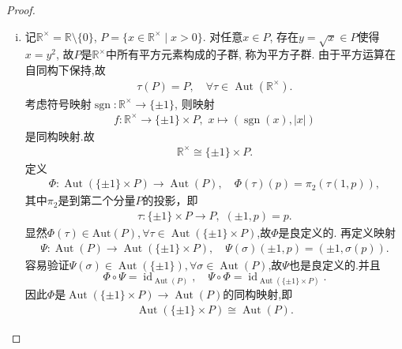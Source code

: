 \documentclass[../../main.tex]{subfiles}%
\begin{document}
\begin{proof}
\begin{enumerate}[(1)]
\begin{enumerate}[(i)]
反之, 任何$\mathbb{R}$上的线性映射显然是加法群同态. 于是加法群同态与$\mathbb{R}$上的线性映射一一对应. 可逆的加法自同构对应可逆的$\mathbb{R}$上的线性映射, 即
$\operatorname{GL}_{\mathbb{Q}}(\mathbb{R})$.因此
$$
\operatorname{Aut}(\mathbb{R},+)\cong\operatorname{GL}_{\mathbb{Q}}(\mathbb{R}).
$$

\item 记$\mathbb{R}^{\times}=\mathbb{R}\setminus\{0\}$, $P=\{x\in\mathbb{R}^{\times}\mid x>0\}$. 对任意$x\in P$, 存在$y=\sqrt{x}\in P$使得$x=y^{2}$, 故$P$是$\mathbb{R}^{\times}$中所有平方元素构成的子群, 称为平方子群. 由于平方运算在自同构下保持,故
\begin{align*}
\tau(P)=P,\quad \forall \tau\in\operatorname{Aut}(\mathbb{R}^{\times}).
\end{align*}
考虑符号映射$\operatorname{sgn}:\mathbb{R}^{\times}\to\{\pm1\}$, 则映射
\begin{align*}
f:\mathbb{R}^{\times}\to \{\pm1\}\times P,\,\,x\mapsto(\operatorname{sgn}(x),|x|)
\end{align*}
是同构映射.故
\begin{align}\label{eqMJIOFJIOWEJFIOJIOJIWJ32904890238}
\mathbb{R}^{\times}\cong\{\pm1\}\times P.
\end{align}
定义
\begin{align*}
\Phi : \operatorname{Aut}(\{\pm 1\} \times P) \to \operatorname{Aut}(P), \quad \Phi(\tau)(p) = \pi_2(\tau(1, p)),
\end{align*}
其中$\pi_2$是到第二个分量$P$的投影，即
\begin{align*}
\tau:\{\pm 1\}\times P\to P,\,\,(\pm 1, p) = p.
\end{align*}
显然$\Phi(\tau)\in \text{Aut}(P),\forall \tau \in \operatorname{Aut}(\{\pm 1\} \times P)$,故$\Phi$是良定义的.
再定义映射
\begin{align*}
\Psi : \operatorname{Aut}(P) \to \operatorname{Aut}(\{\pm 1\} \times P), \quad \Psi(\sigma)(\pm 1, p) = (\pm 1, \sigma(p)).
\end{align*}
容易验证$\Psi(\sigma)\in \operatorname{Aut}(\{\pm 1\}),\forall \sigma \in \operatorname{Aut}(P)$,故$\Psi$也是良定义的.并且
$$
\Phi \circ \Psi = \operatorname{id}_{\operatorname{Aut}(P)},\quad \Psi \circ \Phi = \operatorname{id}_{\operatorname{Aut}(\{\pm 1\} \times P)}.
$$
因此$\Phi$是$\operatorname{Aut}(\{\pm 1\} \times P) \to \operatorname{Aut}(P)$的同构映射,即
\begin{align}\label{eqMJIOFJIOWEJFIOJIOJIWJ32904890238-1}
\operatorname{Aut}(\{\pm 1\} \times P) \cong \operatorname{Aut}(P).
\end{align}

\end{enumerate}
\end{enumerate}
\end{proof}
\end{document}
